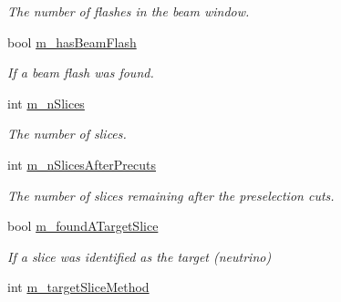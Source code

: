 \begin{DoxyCompactItemize}
\begin{DoxyCompactList}\small\item\em The number of flashes in the beam window. \end{DoxyCompactList}\item 
bool \hyperlink{classflashmatch_1_1FlashMatchingTool_1_1OutputEvent_a9e92162c1cc3f01035790f16a10fa1a3}{m\+\_\+has\+Beam\+Flash}\hypertarget{classflashmatch_1_1FlashMatchingTool_1_1OutputEvent_a9e92162c1cc3f01035790f16a10fa1a3}{}\label{classflashmatch_1_1FlashMatchingTool_1_1OutputEvent_a9e92162c1cc3f01035790f16a10fa1a3}

\begin{DoxyCompactList}\small\item\em If a beam flash was found. \end{DoxyCompactList}\item 
int \hyperlink{classflashmatch_1_1FlashMatchingTool_1_1OutputEvent_aa7f53bbb1437cf37dd0b309583ab17fd}{m\+\_\+n\+Slices}\hypertarget{classflashmatch_1_1FlashMatchingTool_1_1OutputEvent_aa7f53bbb1437cf37dd0b309583ab17fd}{}\label{classflashmatch_1_1FlashMatchingTool_1_1OutputEvent_aa7f53bbb1437cf37dd0b309583ab17fd}

\begin{DoxyCompactList}\small\item\em The number of slices. \end{DoxyCompactList}\item 
int \hyperlink{classflashmatch_1_1FlashMatchingTool_1_1OutputEvent_a1082644564c236e914d79039d09aa4c6}{m\+\_\+n\+Slices\+After\+Precuts}\hypertarget{classflashmatch_1_1FlashMatchingTool_1_1OutputEvent_a1082644564c236e914d79039d09aa4c6}{}\label{classflashmatch_1_1FlashMatchingTool_1_1OutputEvent_a1082644564c236e914d79039d09aa4c6}

\begin{DoxyCompactList}\small\item\em The number of slices remaining after the preselection cuts. \end{DoxyCompactList}\item 
bool \hyperlink{classflashmatch_1_1FlashMatchingTool_1_1OutputEvent_a7f5aaa5a8baaeacce19ffd2e9efdf92f}{m\+\_\+found\+A\+Target\+Slice}\hypertarget{classflashmatch_1_1FlashMatchingTool_1_1OutputEvent_a7f5aaa5a8baaeacce19ffd2e9efdf92f}{}\label{classflashmatch_1_1FlashMatchingTool_1_1OutputEvent_a7f5aaa5a8baaeacce19ffd2e9efdf92f}

\begin{DoxyCompactList}\small\item\em If a slice was identified as the target (neutrino) \end{DoxyCompactList}\item 
int \hyperlink{classflashmatch_1_1FlashMatchingTool_1_1OutputEvent_a840f143d067c5065ecbf8f7e0397bacf}{m\+\_\+target\+Slice\+Method}\hypertarget{classflashmatch_1_1FlashMatchingTool_1_1OutputEvent_a840f143d067c5065ecbf8f7e0397bacf}{}\label{classflashmatch_1_1FlashMatchingTool_1_1OutputEvent_a840f143d067c5065ecbf8f7e0397bacf}


\end{DoxyCompactItemize}

